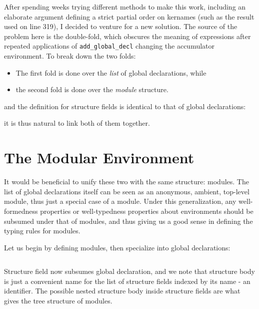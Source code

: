 After spending weeks trying different methods to make this work, including an
elaborate argument defining a strict partial order on kernames (such as the
result used on line 319), I decided to venture for a new solution. The
source of the problem here is the double-fold, which obscures the meaning of
expressions after repeated applications of \verb|add_global_decl| changing the
accumulator environment. To break down the two folds:

\begin{itemize}
  \item The first fold is done over the \emph{list} of global declarations,
  while
  \item the second fold is done over the \emph{module} structure.
\end{itemize}

and the definition for structure fields is identical to that of global
declarations: 


it is thus natural to link both of them together.

\section{The Modular Environment}
\newcommand{\tcc}[3]{\inputminted[firstline={#1},lastline={#2},linenos]{Coq}{
  code/v2/template-coq/theories/#3}}
\newcommand{\pcuicc}[3]{\inputminted[firstline={#1},lastline={#2},linenos]{Coq}{
  code/v2/pcuic/theories/#3}}

It would be beneficial to unify these two with the same structure: modules. The
list of global declarations itself can be seen as an anonymous, ambient,
top-level module, thus just a special case of a module. Under this
generalization, any well-formedness properties or well-typedness properties
about environments should be subsumed under that of modules, and thus giving us
a good sense in defining the typing rules for modules.

Let us begin by defining modules, then specialize into global declarations:

\tcc{325}{336}{Environment.v}

Structure field now subsumes global declaration, and we note that structure body
is just a convenient name for the list of structure fields indexed by its name -
an identifier. The possible nested structure body inside structure fields are
what gives the tree structure of modules.

